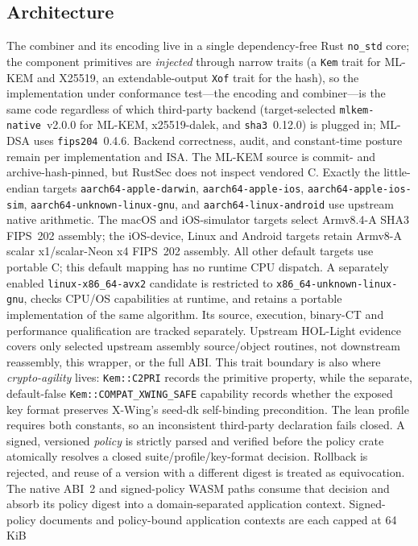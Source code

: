 \documentclass[journal]{IEEEtran}
\newcommand{\code}[1]{\texttt{\small #1}}
\begin{document}
\subsection{Architecture}
The combiner and its encoding live in a single dependency-free Rust \code{no\_std} core; the
component primitives are \emph{injected} through narrow traits (a \code{Kem} trait for ML-KEM and
X25519, an extendable-output \code{Xof} trait for the hash), so the implementation under
conformance test---the encoding and combiner---is the same code regardless of which third-party
backend (target-selected \code{mlkem-native}~v2.0.0 for ML-KEM, x25519-dalek, and \code{sha3}~0.12.0) is
plugged in; ML-DSA uses \code{fips204}~0.4.6. Backend correctness,
audit, and constant-time posture remain per implementation and ISA. The ML-KEM source is
commit- and archive-hash-pinned, but RustSec does not inspect vendored C. Exactly the
little-endian targets \code{aarch64-apple-darwin}, \code{aarch64-apple-ios},
\code{aarch64-apple-ios-sim}, \code{aarch64-unknown-linux-gnu}, and
\code{aarch64-linux-android} use upstream native arithmetic. The macOS and
iOS-simulator targets select Armv8.4-A SHA3 FIPS~202 assembly; the iOS-device,
Linux and Android targets retain Armv8-A scalar x1/scalar-Neon x4 FIPS~202 assembly.
All other default targets use portable C; this default mapping has no runtime
CPU dispatch. A separately enabled \code{linux-x86\_64-avx2} candidate is restricted
to \code{x86\_64-unknown-linux-gnu}, checks CPU/OS capabilities at runtime, and
retains a portable implementation of the same algorithm. Its source, execution,
binary-CT and performance qualification are tracked separately.
Upstream HOL-Light evidence covers only selected upstream assembly
source/object routines, not downstream reassembly, this wrapper, or the full ABI.
This trait boundary is also where \emph{crypto-agility} lives:
\code{Kem::C2PRI} records the primitive property, while the separate, default-false
\code{Kem::COMPAT\_XWING\_SAFE} capability records whether the exposed key format preserves
X-Wing's seed-dk self-binding precondition. The lean profile requires both constants, so an
inconsistent third-party declaration fails closed. A signed, versioned \emph{policy} is strictly parsed and verified before the policy crate
atomically resolves a closed suite/profile/key-format decision. Rollback is rejected, and reuse of a
version with a different digest is treated as equivocation. The native ABI~2 and signed-policy
WASM paths consume that decision and absorb its policy digest into a domain-separated application
context. Signed-policy documents and policy-bound application contexts are each capped at 64\,KiB
\end{document}
